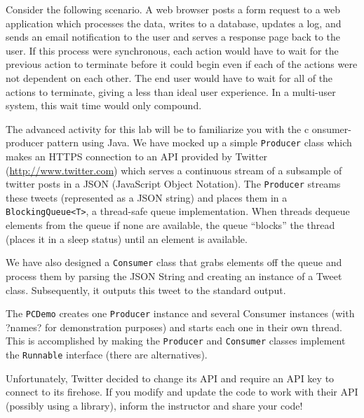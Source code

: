 \documentclass[12pt]{scrartcl}
\begin{document}
Consider the following scenario.  A web browser posts a form request 
to a web application which processes the data, writes to a database, 
updates a log, and sends an email notification to the user and serves 
a response page back to the user.  If this process were synchronous, 
each action would have to wait for the previous action to terminate 
before it could begin even if each of the actions were not dependent 
on each other.  The end user would have to wait for all of the actions 
to terminate, giving a less than ideal user experience.  In a multi-user 
system, this wait time would only compound.

The advanced activity for this lab will be to familiarize you with the c
onsumer-producer pattern using Java.  We have mocked up a simple 
\texttt{Producer} class which makes an HTTPS connection to 
an API provided by Twitter (\url{http://www.twitter.com}) which serves 
a continuous stream of a subsample of twitter posts in a JSON 
(JavaScript Object Notation).  The \texttt{Producer} streams 
these tweets (represented as a JSON string) and places them in a 
\texttt{BlockingQueue<T>}, a thread-safe queue implementation.  
When threads dequeue elements from the queue if none are available, the 
queue ``blocks'' the thread (places it in a sleep status) until an 
element is available.

We have also designed a \texttt{Consumer} class that grabs 
elements off the queue and process them by parsing the JSON String 
and creating an instance of a Tweet class.  Subsequently, it outputs 
this tweet to the standard output.

The \texttt{PCDemo} creates one \texttt{Producer} 
instance and several Consumer instances (with ?names? for demonstration 
purposes) and starts each one in their own thread.  This is accomplished 
by making the \texttt{Producer} and \texttt{Consumer} 
classes implement the \texttt{Runnable} interface (there are 
alternatives).

Unfortunately, Twitter decided to change its API and require an 
API key to connect to its firehose.  If you modify and update the
code to work with their API (possibly using a library), inform
the instructor and share your code!
\end{document}
